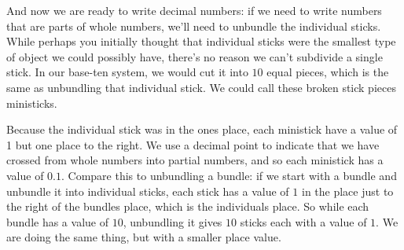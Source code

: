 \documentclass{ximera}
\begin{document}
\begin{center}
\end{center}

And now we are ready to write decimal numbers: if we need to write numbers that are parts of whole numbers, we'll need to unbundle the individual sticks. While perhaps you initially thought that individual sticks were the smallest type of object we could possibly have, there's no reason we can't subdivide a single stick. In our base-ten system, we would cut it into $10$ equal pieces, which is the same as unbundling that individual stick. We could call these broken stick pieces ministicks.

\begin{center}
\end{center}

Because the individual stick was in the ones place, each ministick have a value of 1 but one place to the right. We use a decimal point to indicate that we have crossed from whole numbers into partial numbers, and so each ministick has a value of $0.1$. Compare this to unbundling a bundle: if we start with a bundle and unbundle it into individual sticks, each stick has a value of $1$ in the place just to the right of the bundles place, which is the individuals place. So while each bundle has a value of $10$, unbundling it gives $10$ sticks each with a value of $1$. We are doing the same thing, but with a smaller place value.
\end{document}
